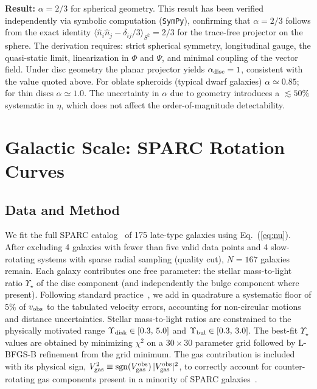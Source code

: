 \documentclass[aps,prd,twocolumn,showpacs,superscriptaddress]{revtex4-2}
\begin{document}
\textbf{Result:} $\alpha = 2/3$ for spherical geometry.
This result has been verified independently via symbolic
computation (\texttt{SymPy}), confirming that $\alpha = 2/3$
follows from the exact identity
$\langle \hat{n}_i\hat{n}_j - \delta_{ij}/3 \rangle_{S^2} = 2/3$
for the trace-free projector on the sphere.
The derivation requires: strict spherical symmetry,
longitudinal gauge, the quasi-static limit, linearization in
$\Phi$ and $\Psi$, and minimal coupling of the vector field.
Under disc geometry the planar projector yields
$\alpha_{\rm disc} = 1$, consistent with the value quoted above.
For oblate
spheroids (typical dwarf galaxies) $\alpha \simeq 0.85$; for thin
discs $\alpha \simeq 1.0$. The uncertainty in $\alpha$ due to geometry
introduces a $\lesssim 50\%$ systematic in $\eta$, which does not
affect the order-of-magnitude detectability.

\section{Galactic Scale: SPARC Rotation Curves}
\label{sec:sparc}

\subsection{Data and Method}

We fit the full SPARC catalog~\cite{Lelli2016} of 175 late-type
galaxies using Eq.~(\ref{eq:nu}).
After excluding 4 galaxies with fewer than five valid data points
and 4 slow-rotating systems with sparse radial sampling (quality cut),
$N=167$ galaxies remain.
Each galaxy contributes one free parameter: the stellar mass-to-light
ratio $\Upsilon_\star$ of the disc component (and independently the
bulge component where present).
Following standard practice~\cite{Li2018}, we add in quadrature a
systematic floor of $5\%$ of $v_{\rm obs}$ to the tabulated velocity
errors, accounting for non-circular motions and distance uncertainties.
Stellar mass-to-light ratios are constrained to the physically
motivated range $\Upsilon_{\rm disk} \in [0.3,\,5.0]$ and
$\Upsilon_{\rm bul} \in [0.3,\,3.0]$.
The best-fit $\Upsilon_\star$ values are obtained by minimizing
$\chi^2$ on a $30\times30$ parameter grid followed by L-BFGS-B
refinement from the grid minimum.
The gas contribution is included with its physical sign,
$V_{\rm gas}^2 \equiv {\rm sgn}(V_{\rm gas}^{\rm obs})\,
|V_{\rm gas}^{\rm obs}|^2$, to correctly account for
counter-rotating gas components present in a minority of SPARC
galaxies~\cite{Oman2015}.
\end{document}
